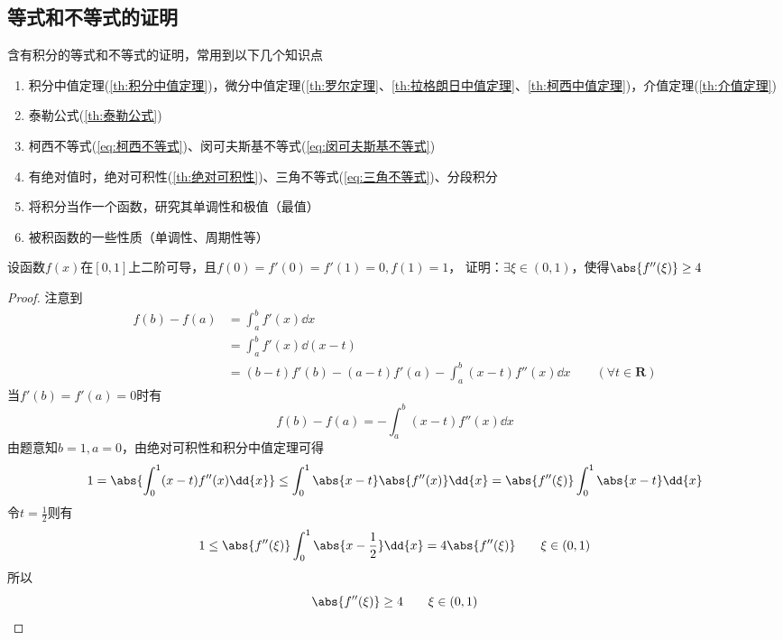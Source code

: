 \subsection{等式和不等式的证明}
含有积分的等式和不等式的证明，常用到以下几个知识点
\begin{enumerate}
    \item 积分中值定理(\ref{th:积分中值定理})，微分中值定理(\ref{th:罗尔定理}、\ref{th:拉格朗日中值定理}、\ref{th:柯西中值定理})，介值定理(\ref{th:介值定理})
    \item 泰勒公式(\ref{th:泰勒公式})
    \item 柯西不等式(\ref{eq:柯西不等式})、闵可夫斯基不等式(\ref{eq:闵可夫斯基不等式})
    \item 有绝对值时，绝对可积性(\ref{th:绝对可积性})、三角不等式(\ref{eq:三角不等式})、分段积分
    \item 将积分当作一个函数，研究其单调性和极值（最值）
    \item 被积函数的一些性质（单调性、周期性等）
\end{enumerate}
\begin{example}
    设函数$f(x)$在$[0,1]$上二阶可导，且$f(0)=f'(0)=f'(1)=0, f(1)=1$，
    证明：$\exists\xi\in(0,1)$，使得$\abs{f''(\xi)}\geq 4$
\end{example}
\begin{proof}
    注意到
    \begin{align*}
        f(b) - f(a) & = \int_a^b f'(x)\dd{x}                                                                \\
                    & = \int_a^b f'(x)\dd(x-t)                                                              \\
                    & = (b-t)f'(b)-(a-t)f'(a) - \int_a^b (x-t)f''(x)\dd{x} \qquad (\forall t\in \mathbf{R})
    \end{align*}
    当$f'(b)=f'(a)=0$时有
    \[ f(b) - f(a) = -\int_a^b (x-t)f''(x)\dd{x} \]
    由题意知$b=1,a=0$，由绝对可积性和积分中值定理可得
    \[
        1
        =
        \abs{\int_0^1 (x-t)f''(x)\dd{x}}
        \leq
        \int_0^1 \abs{x-t}\abs{f''(x)}\dd{x}
        = \abs{f''(\xi)}\int_0^1\abs{x-t}\dd{x}
    \]
    令$t=\frac{1}{2}$则有
    \[ 1 \leq \abs{f''(\xi)} \int_0^1\abs{x-\frac{1}{2}}\dd{x} = 4\abs{f''(\xi)} \qquad \xi\in(0,1)\]
    所以\[ \abs{f''(\xi)} \geq 4 \qquad \xi\in(0,1) \]
\end{proof}

